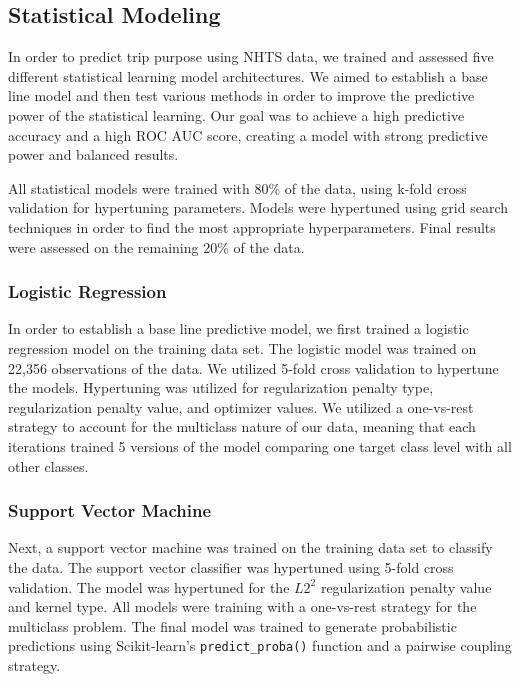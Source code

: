 \documentclass[
  article,
  nofooter]{jss}
\begin{document}
\subsection{Statistical Modeling}\label{statistical-modeling}

In order to predict trip purpose using NHTS data, we trained and
assessed five different statistical learning model architectures. We
aimed to establish a base line model and then test various methods in
order to improve the predictive power of the statistical learning. Our
goal was to achieve a high predictive accuracy and a high ROC AUC score,
creating a model with strong predictive power and balanced results.

All statistical models were trained with 80\% of the data, using k-fold
cross validation for hypertuning parameters. Models were hypertuned
using grid search techniques in order to find the most appropriate
hyperparameters. Final results were assessed on the remaining 20\% of
the data.

\subsubsection{Logistic Regression}\label{logistic-regression}

In order to establish a base line predictive model, we first trained a
logistic regression model on the training data set. The logistic model
was trained on 22,356 observations of the data. We utilized 5-fold cross
validation to hypertune the models. Hypertuning was utilized for
regularization penalty type, regularization penalty value, and optimizer
values. We utilized a one-vs-rest strategy to account for the multiclass
nature of our data, meaning that each iterations trained 5 versions of
the model comparing one target class level with all other classes.

\subsubsection{Support Vector Machine}\label{support-vector-machine}

Next, a support vector machine was trained on the training data set to
classify the data. The support vector classifier was hypertuned using
5-fold cross validation. The model was hypertuned for the \(L2^2\)
regularization penalty value and kernel type. All models were training
with a one-vs-rest strategy for the multiclass problem. The final model
was trained to generate probabilistic predictions using Scikit-learn's
\texttt{predict\_proba()} function and a pairwise coupling strategy.
\end{document}
